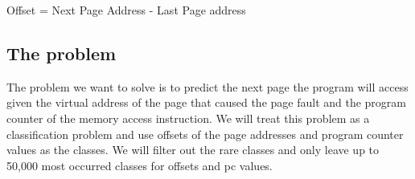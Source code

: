 \begin{definition}
    {Offset} = {Next Page Address} - {Last Page address}
\end{definition}

\subsection{The problem}


The problem we want to solve is to predict the next page the program will access given the virtual address of the page that caused the page fault and the program counter of the memory access instruction. We will treat this problem as a classification problem and use offsets of the page addresses and program counter values as the classes. We will filter out the rare classes and only leave up to 50,000 most occurred classes for offsets and pc values.